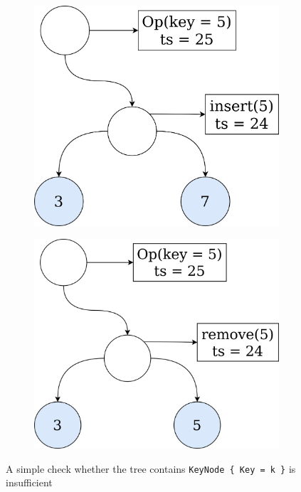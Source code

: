 \documentclass[times, dvipsnames,%
               languages={russian,english} %
              ]{itmo-student-thesis}
\begin{document}
\begin{figure}[H]
     \centering
     \begin{subfigure}[b]{0.45\linewidth}
          \centering
          \includegraphics[width=\linewidth]{pics/uncompleted-insert.png}
          \label{uncompleted-insert-pic}
     \end{subfigure}
     \hfill
     \begin{subfigure}[b]{0.45\linewidth}
          \centering
          \includegraphics[width=\linewidth]{pics/uncompleted-remove.png}
          \label{uncompleted-remove-pic}
     \end{subfigure}
    \caption{A simple check whether the tree contains \texttt{KeyNode \{ Key = k \}} is insufficient}
    \label{unfinished-insert-remove-pics}
\end{figure}
\end{document}
